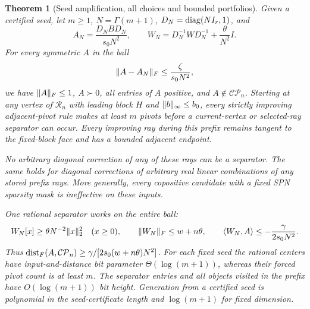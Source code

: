 \documentclass[11pt]{article}
\newtheorem{theorem}{Theorem}[section]
\theoremstyle{definition}\newtheorem{definition}[theorem]{Definition}
\theoremstyle{remark}\newtheorem{remark}[theorem]{Remark}
\newcommand{\CP}{\mathcal{CP}}\newcommand{\COP}{\mathcal{COP}}\newcommand{\Ry}{\mathcal R}
\begin{document}
\begin{theorem}[Seed amplification, all choices and bounded portfolios]\label{thm:amplification}
Given a certified seed, let $m\ge1$, $N=\Gamma(m+1)$, $D_N=\operatorname{diag}(NI_r,1)$, and
\[
 A_N=\frac{D_NBD_N}{s_0N^2},\qquad
 W_N=D_N^{-1}WD_N^{-1}+\frac\theta{N^2}I.
\]
For every symmetric $A$ in the ball
\begin{equation}\label{eq:ball}
 \lVert A-A_N\rVert_F\le\frac\zeta{s_0N^2},
\end{equation}
we have $\lVert A\rVert_F\le1$, $A\succ0$, all entries of $A$ positive, and $A\notin\CP_n$. Starting at \emph{any} vertex of $\Ry_n$ with leading block $H$ and $\lVert b\rVert_\infty\le b_0$, every strictly improving adjacent-pivot rule makes at least $m$ pivots before a current-vertex or selected-ray separator can occur. Every improving ray during this prefix remains tangent to the fixed-block face and has a bounded adjacent endpoint.

No arbitrary diagonal correction of any of these rays can be a separator. The same holds for diagonal corrections of arbitrary real linear combinations of any stored prefix rays. More generally, every copositive candidate with a fixed SPN sparsity mask is ineffective on these inputs.

One rational separator works on the entire ball:
\[
 W_N[x]\ge\theta N^{-2}\lVert x\rVert_2^2\quad(x\ge0),\qquad
 \lVert W_N\rVert_F\le w+n\theta,\qquad
 \langle W_N,A\rangle\le-\frac\gamma{2s_0N^2}.
\]
Thus $\dist_F(A,\CP_n)\ge\gamma/[2s_0(w+n\theta)N^2]$. For each fixed seed the rational centers have input-and-distance bit parameter $\Theta(\log(m+1))$, whereas their forced pivot count is at least $m$. The separator entries and all objects visited in the prefix have $O(\log(m+1))$ bit height. Generation from a certified seed is polynomial in the seed-certificate length and $\log(m+1)$ for fixed dimension.
\end{theorem}
\end{document}
